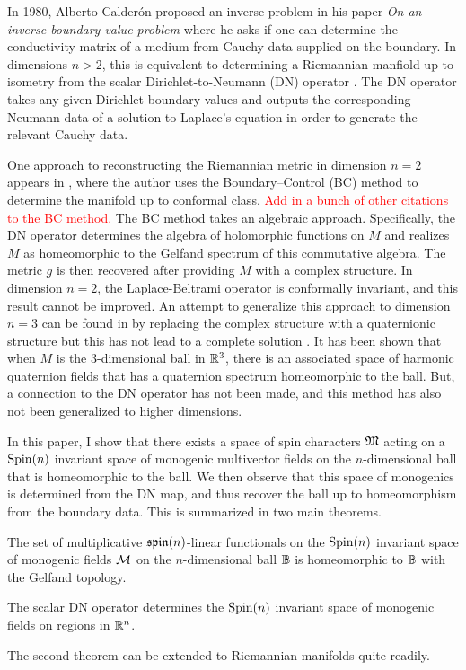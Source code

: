 In 1980, Alberto Calder\'on proposed an inverse problem in his paper \emph{On an inverse boundary value problem} \cite{calderon_inverse_2006} where he asks if one can determine the conductivity matrix of a medium from Cauchy data supplied on the boundary.  In dimensions $n>2$, this is equivalent to determining a Riemannian manfiold up to isometry from the scalar Dirichlet-to-Neumann (DN) operator \cite{feldman_calderproblem_nodate, salo_calderon_nodate, uhlmann_inverse_2014}. The DN operator takes any given Dirichlet boundary values and outputs the corresponding Neumann data of a solution to Laplace's equation in order to generate the relevant Cauchy data.  

One approach to reconstructing the Riemannian metric in dimension $n=2$ appears in \cite{belishev_calderon_2003}, where the author uses the Boundary--Control (BC) method to determine the manifold up to conformal class. \textcolor{red}{Add in a bunch of other citations to the BC method.} The BC method takes an algebraic approach. Specifically, the DN operator determines the algebra of holomorphic functions on $M$ and realizes $M$ as homeomorphic to the Gelfand spectrum of this commutative algebra. The metric $g$ is then recovered after providing $M$ with a complex structure. In dimension $n=2$, the Laplace-Beltrami operator is conformally invariant, and this result cannot be improved.  An attempt to generalize this approach to dimension $n=3$ can be found in by replacing the complex structure with a quaternionic structure but this has not lead to a complete solution \cite{belishev_algebras_2017, belishev_algebraic_2019}.  It has been shown that when $M$ is the 3-dimensional ball in $\mathbb{R}^3$, there is an associated space of harmonic quaternion fields that has a quaternion spectrum homeomorphic to the ball. But, a connection to the DN operator has not been made, and this method has also not been generalized to higher dimensions.

In this paper, I show that there exists a space of spin characters $\mathfrak{M}$ acting on a $\operatorname{Spin}(n)$ invariant space of monogenic multivector fields on the $n$-dimensional ball that is homeomorphic to the ball.  We then observe that this space of monogenics is determined from the DN map, and thus recover the ball up to homeomorphism from the boundary data.  This is summarized in two main theorems.
\begin{theorem*}
The set of multiplicative $\mathfrak{spin}(n)$-linear functionals on the $\operatorname{Spin}(n)$ invariant space of monogenic fields $\mathcal{M}$ on the $n$-dimensional ball $\mathbb{B}$ is homeomorphic to $\mathbb{B}$ with the Gelfand topology.
\end{theorem*}
\begin{theorem*}
The scalar DN operator determines the $\operatorname{Spin}(n)$ invariant space of monogenic fields on regions in $\mathbb{R}^n$.
\end{theorem*}
The second theorem can be extended to Riemannian manifolds quite readily.

